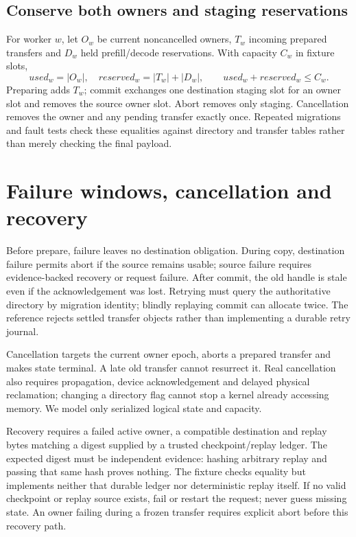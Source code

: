 \subsection{Conserve both owners and staging reservations}
For worker $w$, let $O_w$ be current noncancelled owners, $T_w$ incoming
prepared transfers and $D_w$ held prefill/decode reservations. With capacity
$C_w$ in fixture slots,
\[
 used_w=|O_w|,\quad reserved_w=|T_w|+|D_w|,
 \qquad used_w+reserved_w\le C_w.
\]
Preparing adds $T_w$; commit exchanges one destination staging slot for an
owner slot and removes the source owner slot. Abort removes only staging.
Cancellation removes the owner and any pending transfer exactly once.
Repeated migrations and fault tests check these equalities against directory
and transfer tables rather than merely checking the final payload.

\section{Failure windows, cancellation and recovery}
\label{evod46:failure}
Before prepare, failure leaves no destination obligation. During copy,
destination failure permits abort if the source remains usable; source failure
requires evidence-backed recovery or request failure. After commit, the old
handle is stale even if the acknowledgement was lost. Retrying must query the
authoritative directory by migration identity; blindly replaying commit can
allocate twice. The reference rejects settled transfer objects rather than
implementing a durable retry journal.

Cancellation targets the current owner epoch, aborts a prepared transfer and
makes state terminal. A late old transfer cannot resurrect it. Real
cancellation also requires propagation, device acknowledgement and delayed
physical reclamation; changing a directory flag cannot stop a kernel already
accessing memory. We model only serialized logical state and capacity.

Recovery requires a failed active owner, a compatible destination and replay
bytes matching a digest supplied by a trusted checkpoint/replay ledger.
The expected digest must be independent evidence: hashing arbitrary replay
and passing that same hash proves nothing. The fixture checks equality but
implements neither that durable ledger nor deterministic replay itself.
If no valid checkpoint or replay source exists, fail or restart the request;
never guess missing state. An owner failing during a frozen transfer requires
explicit abort before this recovery path.

